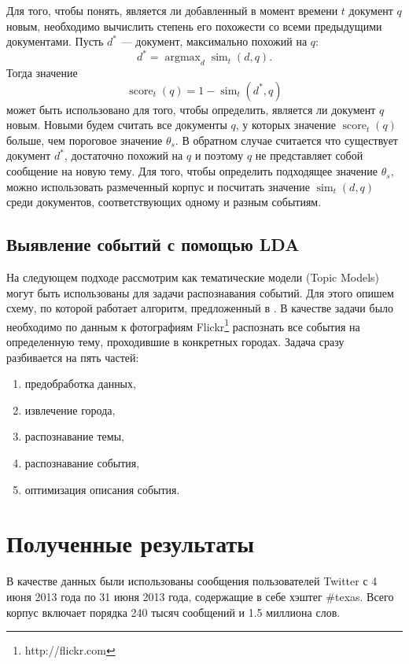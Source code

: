 \documentclass[12pt, a4paper]{article}
\DeclareMathOperator*{\argmax}{argmax}
\DeclareMathOperator{\score}{score}
\DeclareMathOperator{\simu}{sim}
\begin{document}
	Для того, чтобы понять, является ли добавленный в момент времени $t$ документ $q$ новым, необходимо вычислить степень его похожести со всеми предыдущими документами. Пусть $d^*$ --- документ, максимально похожий на $q$:
	\begin{equation}
	d^* = \argmax_d \simu_t (d,q).
	\end{equation}
	Тогда значение
	\begin{equation}
	\score_t(q) = 1 - \simu_t (d^*, q)
	\end{equation}
	может быть использовано для того, чтобы определить, является ли документ $q$ новым. Новыми будем считать все документы $q$, у которых значение $\score_t(q)$ больше, чем пороговое значение $\theta_s$. В обратном случае считается что существует документ $d^*$, достаточно похожий на $q$ и поэтому $q$ не представляет собой сообщение на новую тему. Для того, чтобы определить подходящее значение $\theta_s$, можно использовать размеченный корпус и посчитать значение $\simu_t (d,q)$ среди документов, соответствующих одному и разным событиям.
	
	\subsection{Выявление событий с помощью LDA}
  На следующем подходе рассмотрим как тематические модели (Topic Models) могут быть использованы для задачи распознавания событий. Для этого опишем схему, по которой работает алгоритм, предложенный в \cite{mediaeval}. В качестве задачи было необходимо по данным к фотографиям Flickr\footnote{http://flickr.com} распознать все события на определенную тему, проходившие в конкретных городах. Задача сразу разбивается на пять частей: 
  \begin{enumerate}
  \item предобработка данных,
  \item извлечение города,
  \item распознавание темы,
  \item распознавание события,
  \item оптимизация описания события.
  \end{enumerate}
  

  
  \section{Полученные результаты}
  В качестве данных были использованы сообщения пользователей Twitter с 4 июня 2013 года по 31 июня 2013 года, содержащие в себе хэштег \#texas. Всего корпус включает порядка 240 тысяч сообщений и 1.5 миллиона слов. 
\end{document}
